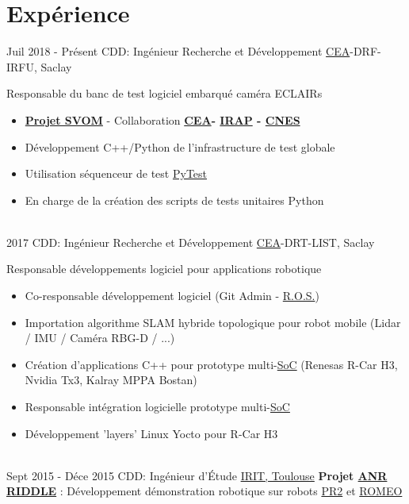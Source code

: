 \documentclass[letterpaper]{twentysecondcv} %
\newcommand{\cea}{\href{http://www.cea.fr/}{CEA}}
\newcommand{\ros}{\href{http://www.ros.org/}{R.O.S.}}
\begin{document}
\section{Expérience}
\begin{twenty} %
  \twentyitem
  {Juil 2018 -}
  {Présent}
  {CDD: Ingénieur Recherche et Développement}
  {\cea-DRF-IRFU, Saclay}
  {}
  {
    Responsable du banc de test logiciel embarqué caméra ECLAIRs
    \begin{itemize}
    \item \textbf{\href{http://www.svom.fr/}{Projet SVOM}} - Collaboration
      \textbf{\cea - \href{http://www.irap.omp.eu/}{IRAP} - \href{https://cnes.fr/fr}{CNES} }
    \item Développement C++/Python de l'infrastructure de test globale
    \item Utilisation séquenceur de test \href{https://docs.pytest.org/en/latest/contents.html}{PyTest}
    \item En charge de la création des scripts de tests unitaires Python
    \end{itemize}
  }
  \\
  \twentyitem
  {2017}
  {}
  {CDD: Ingénieur Recherche et Développement}
  {\cea-DRT-LIST, Saclay}
  {}
  {
    Responsable développements logiciel pour applications robotique
    \begin{itemize}
    \item Co-responsable développement logiciel (Git Admin - \ros)
    \item Importation algorithme SLAM hybride topologique pour robot mobile (Lidar / IMU / Caméra RBG-D / ...)
    \item Création d'applications C++ pour prototype
      multi-\href{https://en.wikipedia.org/wiki/System_on_a_chip}{SoC} (Renesas R-Car
      H3, Nvidia Tx3, Kalray MPPA Bostan)
    \item Responsable intégration logicielle prototype
      multi-\href{https://en.wikipedia.org/wiki/System_on_a_chip}{SoC}
    \item Développement 'layers' Linux Yocto pour R-Car H3
    \end{itemize}
  }
  \\
  \twentyitem
  {Sept 2015 -}
  {Déce 2015}
  {CDD: Ingénieur d'Étude}
  {\href{http://www.cea.fr/}{IRIT, Toulouse}}
  {}
  {
    \textbf{Projet
      \href{http://www.agence-nationale-recherche.fr/Project-ANR-12-CORD-0003}{ANR
        RIDDLE}} : Développement démonstration robotique sur robots \href{http://www.willowgarage.com/pages/pr2/overview}{PR2} et \href{https://spectrum.ieee.org/automaton/robotics/humanoids/aldebaran-robotics-introduces-romeo-finally}{ROMEO}
}
\end{twenty}
\end{document}
